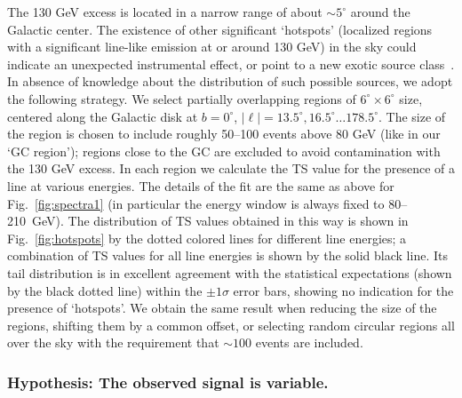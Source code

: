 \documentclass[aps,twocolumn,prd,superscriptaddress,showpacs,nofootinbib,fixfloat]{revtex4}
\begin{document}
The 130 GeV excess is located in a narrow range of about $\sim5^\circ$ around
the Galactic center. The existence of other significant `hotspots' (localized
regions with a significant line-like emission at or around 130 GeV) in the sky
could indicate an unexpected instrumental effect, or point to a new exotic
source class~\cite{Boyarsky:2012ca}. 
In absence of knowledge about the distribution of such possible
sources, we adopt the following strategy. We select partially overlapping regions of
$6^\circ\times6^\circ$ size, centered along the Galactic disk at
$b=0^\circ$, $|\ell|=13.5^\circ, 16.5^\circ \dots 178.5^\circ$. The size of
the region is chosen to include roughly 50--100 events above 80 GeV (like in our `GC
region'); regions close to the GC are excluded to avoid contamination with the
130 GeV excess. In each region we calculate the TS value for the presence of
a line at various energies. The details of the fit are the same as above for
Fig.~\ref{fig:spectra1} (in particular the energy window is always fixed to
80--210~GeV). The distribution of TS values obtained in this way is
shown in Fig.~\ref{fig:hotspots} by the dotted colored lines for different
line energies; a combination of
TS values for all line energies is shown by the solid black line. Its tail
distribution is in excellent agreement with the statistical expectations
(shown by the black dotted line) within the $\pm1\sigma$ error bars, showing
no indication for the presence of `hotspots'. We obtain the same 
result when reducing the size of the regions,
shifting them by a common offset, or selecting random circular regions all
over the
sky with the requirement that $\sim100$ events are included. 

\subsubsection{Hypothesis: The observed signal is variable.}
\end{document}
